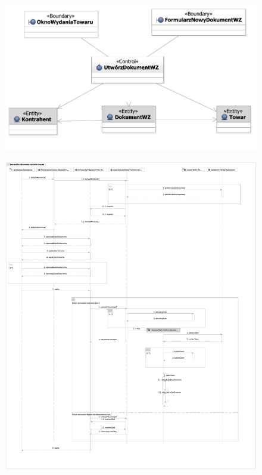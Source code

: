 \begin{figure}[H]
  \centering
  \includegraphics[angle=\ecbangle, scale=\ecbscale]{../img/usecase/pu13ecb.pdf}
  \caption{}
\end{figure}
\newpage
\begin{figure}[H]
  \centering
  \includegraphics[angle=\seqangle, scale=0.35]{../img/usecase/pu13seq.pdf}
  \caption{}
\end{figure}
\newpage

